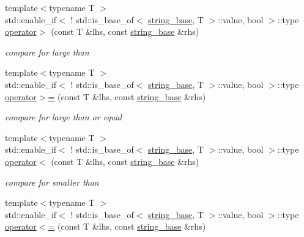 \begin{DoxyCompactItemize}
\mbox{\label{namespacehwlib_a1076d3be6e5022278a0514b886901dde}} 
{\footnotesize template$<$typename T $>$ }\\std\+::enable\+\_\+if$<$ ! std\+::is\+\_\+base\+\_\+of$<$ \hyperlink{classhwlib_1_1string__base}{string\+\_\+base}, T $>$\+::value, bool $>$\+::type \hyperlink{namespacehwlib_a1076d3be6e5022278a0514b886901dde}{operator$>$} (const T \&lhs, const \hyperlink{classhwlib_1_1string__base}{string\+\_\+base} \&rhs)
\begin{DoxyCompactList}\small\item\em compare for large than \end{DoxyCompactList}\item 
\mbox{\label{namespacehwlib_a4cc49ba4eadea48695a4a8e840529c43}} 
{\footnotesize template$<$typename T $>$ }\\std\+::enable\+\_\+if$<$ ! std\+::is\+\_\+base\+\_\+of$<$ \hyperlink{classhwlib_1_1string__base}{string\+\_\+base}, T $>$\+::value, bool $>$\+::type \hyperlink{namespacehwlib_a4cc49ba4eadea48695a4a8e840529c43}{operator$>$=} (const T \&lhs, const \hyperlink{classhwlib_1_1string__base}{string\+\_\+base} \&rhs)
\begin{DoxyCompactList}\small\item\em compare for large than or equal \end{DoxyCompactList}\item 
\mbox{\label{namespacehwlib_a57b60e2aaed94e65133d70811a3a6308}} 
{\footnotesize template$<$typename T $>$ }\\std\+::enable\+\_\+if$<$ ! std\+::is\+\_\+base\+\_\+of$<$ \hyperlink{classhwlib_1_1string__base}{string\+\_\+base}, T $>$\+::value, bool $>$\+::type \hyperlink{namespacehwlib_a57b60e2aaed94e65133d70811a3a6308}{operator$<$} (const T \&lhs, const \hyperlink{classhwlib_1_1string__base}{string\+\_\+base} \&rhs)
\begin{DoxyCompactList}\small\item\em compare for smaller than \end{DoxyCompactList}\item 
\mbox{\label{namespacehwlib_a5b4b2bb65a42dc81a8a322fe5c559f94}} 
{\footnotesize template$<$typename T $>$ }\\std\+::enable\+\_\+if$<$ ! std\+::is\+\_\+base\+\_\+of$<$ \hyperlink{classhwlib_1_1string__base}{string\+\_\+base}, T $>$\+::value, bool $>$\+::type \hyperlink{namespacehwlib_a5b4b2bb65a42dc81a8a322fe5c559f94}{operator$<$=} (const T \&lhs, const \hyperlink{classhwlib_1_1string__base}{string\+\_\+base} \&rhs)

\end{DoxyCompactItemize}
